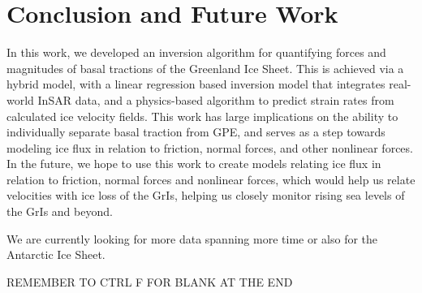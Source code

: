 \documentclass{article}
\begin{document}
\section{Conclusion and Future Work}

In this work, we developed an inversion algorithm for quantifying forces and magnitudes of basal tractions of the Greenland Ice Sheet. This is achieved via a hybrid model, with a linear regression based inversion model that integrates real-world InSAR data, and a physics-based algorithm to predict strain rates from calculated ice velocity fields. This work has large implications on the ability to individually separate basal traction from GPE, and serves as a step towards modeling ice flux in relation to friction, normal forces, and other nonlinear forces. In the future, we hope to use this work to create models relating ice flux in relation to friction, normal forces and nonlinear forces, which would help us relate velocities with ice loss of the GrIs, helping us closely monitor rising sea levels of the GrIs and beyond.


We are currently looking for more data spanning more time or also for the Antarctic Ice Sheet.

REMEMBER TO CTRL F FOR BLANK AT THE END



\end{document}
